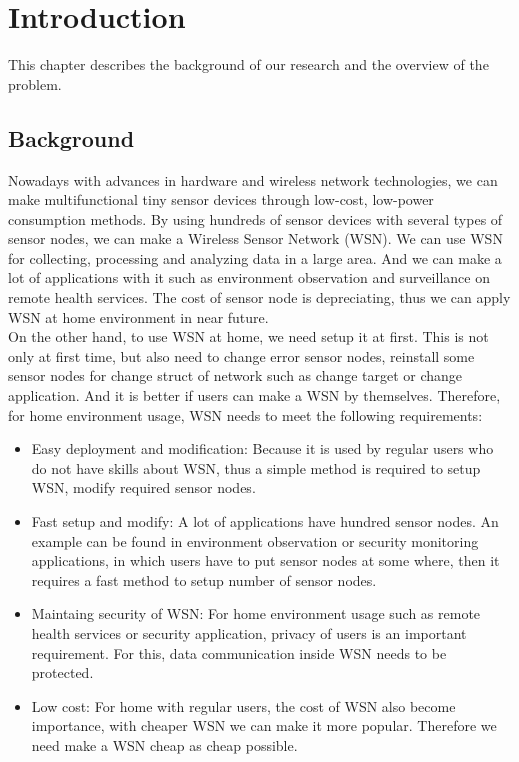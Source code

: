 \chapter{Introduction}\label{chap:intro}
This chapter describes the background of our research and the overview of the problem.
\clearpage
\section{Background}\label{sec:intro_background}
Nowadays with advances in hardware and wireless network technologies, we can make multifunctional tiny sensor devices through low-cost, low-power consumption methods. By using hundreds of sensor devices with several types of sensor nodes, we can make a Wireless Sensor Network (WSN). We can use WSN for collecting, processing and analyzing data in a large area. And we can make a lot of applications with it such as environment observation and surveillance on remote health services. The cost of sensor node is depreciating, thus we can apply WSN at home environment in near future.\\
On the other hand, to use WSN at home, we need setup it at first. This is not only at first time, but also need to change error sensor nodes, reinstall some sensor nodes for change struct of network such as change target or change application. And it is better if users can make a WSN by themselves. Therefore, for home environment usage, WSN needs to meet the following requirements:
\begin{itemize}
\item {Easy deployment and modification: Because it is used by regular users who do not have skills about WSN, thus a simple method is required to setup WSN, modify required sensor nodes.}
\item {Fast setup and modify: A lot of applications have hundred sensor nodes. An example can be found in environment observation or security monitoring applications, in which users have to put sensor nodes at some where, then it requires a fast method to setup number of sensor nodes.}
\item {Maintaing security of WSN: For home environment usage such as remote health services or security application, privacy of users is an important requirement. For this, data communication inside WSN needs to be protected.}
\item {Low cost: For home with regular users, the cost of WSN also become importance, with cheaper WSN we can make it more popular. Therefore we need make a WSN cheap as cheap possible.}
\end{itemize}
